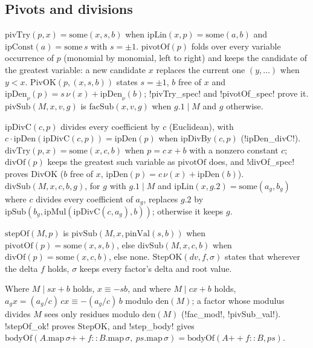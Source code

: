 \subsection{Pivots and divisions}

\begin{definition}[Pivots]
$\mathrm{pivTry}(p,x)=\mathrm{some}(x,s,b)$ when $\mathrm{ipLin}(x,p)=\mathrm{some}(a,b)$ and $\mathrm{ipConst}(a)=\mathrm{some}\,s$ with $s=\pm1$. $\mathrm{pivotOf}(p)$ folds over every variable occurrence of $p$ (monomial by monomial, left to right) and keeps the candidate of the greatest variable: a new candidate $x$ replaces the current one $(y,\dots)$ when $y<x$. $\mathrm{PivOK}(p,(x,s,b))$ states $s=\pm1$, $b$ free of $x$ and $\mathrm{ipDen}_\nu(p)=s\,\nu(x)+\mathrm{ipDen}_\nu(b)$; \lean!pivTry_spec! and \lean!pivotOf_spec! prove it. $\mathrm{pivSub}(M,x,v,g)$ is $\mathrm{facSub}(x,v,g)$ when $g.1\mid M$ and $g$ otherwise.
\end{definition}

\begin{definition}[Divisions]
$\mathrm{ipDivC}(c,p)$ divides every coefficient by $c$ (Euclidean), with $c\cdot\mathrm{ipDen}(\mathrm{ipDivC}(c,p))=\mathrm{ipDen}(p)$ when $\mathrm{ipDivBy}(c,p)$ (\lean!ipDen_divC!). $\mathrm{divTry}(p,x)=\mathrm{some}(x,c,b)$ when $p=c\,x+b$ with a nonzero constant $c$; $\mathrm{divOf}(p)$ keeps the greatest such variable as $\mathrm{pivotOf}$ does, and \lean!divOf_spec! proves $\mathrm{DivOK}$ ($b$ free of $x$, $\mathrm{ipDen}(p)=c\,\nu(x)+\mathrm{ipDen}(b)$). $\mathrm{divSub}(M,x,c,b,g)$, for $g$ with $g.1\mid M$ and $\mathrm{ipLin}(x,g.2)=\mathrm{some}(a_g,b_g)$ where $c$ divides every coefficient of $a_g$, replaces $g.2$ by $\mathrm{ipSub}(b_g,\mathrm{ipMul}(\mathrm{ipDivC}(c,a_g),b))$; otherwise it keeps $g$.
\end{definition}

\begin{definition}
$\mathrm{stepOf}(M,p)$ is $\mathrm{pivSub}(M,x,\mathrm{pinVal}(s,b))$ when $\mathrm{pivotOf}(p)=\mathrm{some}(x,s,b)$, else $\mathrm{divSub}(M,x,c,b)$ when $\mathrm{divOf}(p)=\mathrm{some}(x,c,b)$, else $\mathrm{none}$. $\mathrm{StepOK}(dv,f,\sigma)$ states that wherever the delta $f$ holds, $\sigma$ keeps every factor's delta and root value.
\end{definition}

Where $M\mid sx+b$ holds, $x\equiv-sb$, and where $M\mid cx+b$ holds, $a_gx=(a_g/c)\,cx\equiv-(a_g/c)\,b$ modulo $\mathrm{den}(M)$; a factor whose modulus divides $M$ sees only residues modulo $\mathrm{den}(M)$ (\lean!fac_mod!, \lean!pivSub_val!). \lean!stepOf_ok! proves $\mathrm{StepOK}$, and \lean!step_body! gives $\mathrm{bodyOf}(A.\mathrm{map}\,\sigma\mathbin{+\!\!+}f\mathbin{::}B.\mathrm{map}\,\sigma,\ ps.\mathrm{map}\,\sigma)=\mathrm{bodyOf}(A\mathbin{+\!\!+}f\mathbin{::}B,ps)$.

